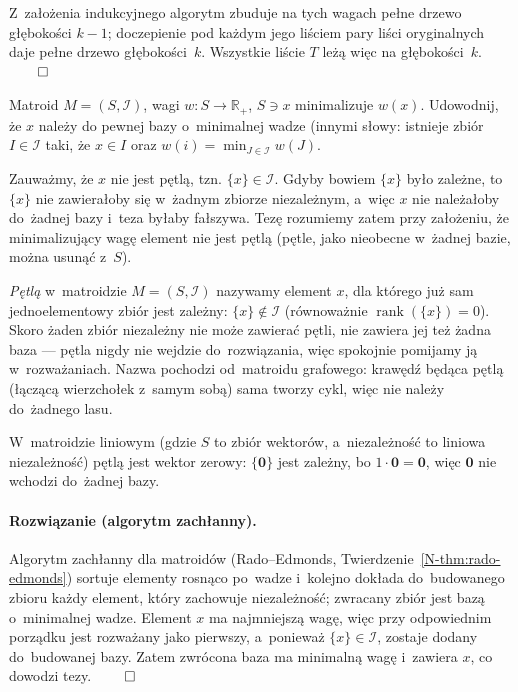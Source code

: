 Z~założenia indukcyjnego algorytm zbuduje na tych wagach pełne drzewo
głębokości $k-1$; doczepienie pod każdym jego liściem pary liści oryginalnych
daje pełne drzewo głębokości~$k$. Wszystkie liście $T$ leżą więc na
głębokości~$k$. $\qed$

\clearpage
\begin{zadanie}
	Matroid $M=(S,\mathcal{I})$, wagi $w:S\to\mathbb{R}_+$, $S\ni x$ minimalizuje
	$w(x)$. Udowodnij, że $x$ należy do pewnej bazy o~minimalnej wadze 
(innymi słowy: istnieje zbiór $I \in \mathcal{I}$ taki, że $x\in I$ oraz $w(i) = \min_{J\in\mathcal{I}}w(J)$.
\end{zadanie}

Zauważmy, że $x$ nie jest pętlą, tzn. $\{x\}\in\mathcal{I}$. Gdyby bowiem $\{x\}$
było zależne, to $\{x\}$ nie zawierałoby się w~żadnym zbiorze niezależnym, a~więc
$x$ nie należałoby do~żadnej bazy i~teza byłaby fałszywa. Tezę rozumiemy zatem
przy założeniu, że minimalizujący wagę element nie jest pętlą (pętle, jako
nieobecne w~żadnej bazie, można usunąć z~$S$).

\begin{dygresja}
	\emph{Pętlą} w~matroidzie $M=(S,\mathcal{I})$ nazywamy element $x$, dla którego
	już sam jednoelementowy zbiór jest zależny: $\{x\}\notin\mathcal{I}$
	(równoważnie $\operatorname{rank}(\{x\})=0$). Skoro żaden zbiór niezależny nie
	może zawierać pętli, nie zawiera jej też żadna baza --- pętla nigdy nie wejdzie
	do~rozwiązania, więc spokojnie pomijamy ją w~rozważaniach. Nazwa pochodzi
	od~matroidu grafowego: krawędź będąca pętlą (łączącą wierzchołek z~samym sobą)
	sama tworzy cykl, więc nie należy do~żadnego lasu.

	W~matroidzie liniowym (gdzie $S$ to zbiór wektorów, a~niezależność to liniowa
	niezależność) pętlą jest wektor zerowy: $\{\mathbf{0}\}$ jest zależny, bo
	$1\cdot\mathbf{0}=\mathbf{0}$, więc $\mathbf{0}$ nie wchodzi do~żadnej bazy.
\end{dygresja}

\paragraph{Rozwiązanie (algorytm zachłanny).}
Algorytm zachłanny dla matroidów (Rado--Edmonds,
Twierdzenie~\ref*{N-thm:rado-edmonds}) sortuje elementy rosnąco po~wadze i~kolejno
dokłada do~budowanego zbioru każdy element, który zachowuje niezależność;
zwracany zbiór jest bazą o~minimalnej wadze. Element $x$ ma najmniejszą wagę, więc
przy odpowiednim porządku jest rozważany jako pierwszy, a~ponieważ $\{x\}\in\mathcal{I}$,
zostaje dodany do~budowanej bazy. Zatem zwrócona baza ma minimalną wagę i~zawiera
$x$, co dowodzi tezy. $\qed$

